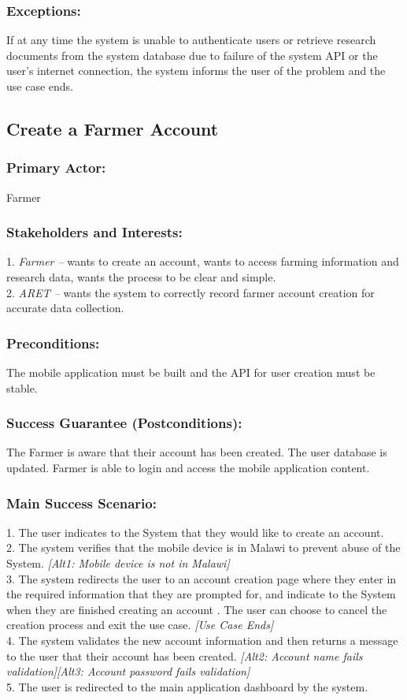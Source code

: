 \documentclass[12pt,letterpaper]{article}
\begin{document}
\subsubsection*{Exceptions:}
If at any time the system is unable to authenticate users or retrieve research documents from the system database due to failure of the system API or the user’s internet connection, the system informs the user of the problem and the use case ends.

\clearpage
\subsection{Create a Farmer Account}
\subsubsection*{Primary Actor:} Farmer
\subsubsection*{Stakeholders and Interests:}
1. \emph{Farmer --} wants to create an account, wants to access farming information and research data, wants the process to be clear and simple. \\[10pt]
2. \emph{ARET --} wants the system to correctly record farmer account creation for accurate data collection.
\subsubsection*{Preconditions:}
The mobile application must be built and the API for user creation must be stable.

\subsubsection*{Success Guarantee (Postconditions):}
The Farmer is aware that their account has been created. The user database is updated. Farmer is able to login and access the mobile application content.

\subsubsection*{Main Success Scenario:}
1. The user indicates to the System that they would like to create an account.\\
2. The system verifies that the mobile device is in Malawi to prevent abuse of the System. \emph{[Alt1: Mobile device is not in Malawi]}\\
3. The system redirects the user to an account creation page where they enter in the required information that they are prompted for, and indicate to the System when they are finished creating an account . The user can choose to cancel the creation process and exit the use case. \emph{[Use Case Ends]}\\
4. The system validates the new account information and then returns a message to the user that their account has been created. \emph{[Alt2: Account name fails validation][Alt3: Account password fails validation]}\\
5. The user is redirected to the main application dashboard by the system.
\end{document}

